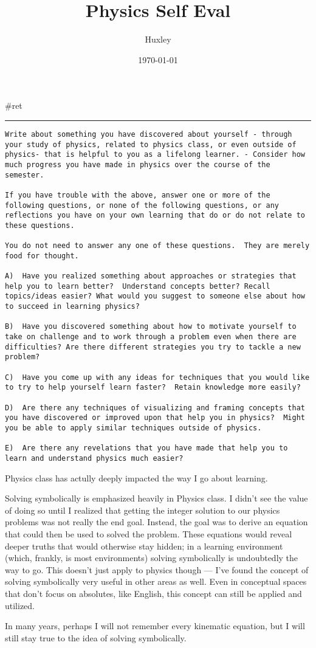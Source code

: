 \documentclass[letterpaper]{article}
\author{Huxley}
\date{\today}
\title{Physics Self Eval}
\renewcommand{\tableofcontents}{}
\begin{document}
\tableofcontents

\#ret

\noindent\rule{\textwidth}{0.5pt}

\begin{verbatim}
Write about something you have discovered about yourself - through your study of physics, related to physics class, or even outside of physics- that is helpful to you as a lifelong learner. - Consider how much progress you have made in physics over the course of the semester.

If you have trouble with the above, answer one or more of the following questions, or none of the following questions, or any reflections you have on your own learning that do or do not relate to these questions.

You do not need to answer any one of these questions.  They are merely food for thought.

A)  Have you realized something about approaches or strategies that help you to learn better?  Understand concepts better? Recall topics/ideas easier? What would you suggest to someone else about how to succeed in learning physics?

B)  Have you discovered something about how to motivate yourself to take on challenge and to work through a problem even when there are difficulties? Are there different strategies you try to tackle a new problem?

C)  Have you come up with any ideas for techniques that you would like to try to help yourself learn faster?  Retain knowledge more easily?

D)  Are there any techniques of visualizing and framing concepts that you have discovered or improved upon that help you in physics?  Might you be able to apply similar techniques outside of physics.

E)  Are there any revelations that you have made that help you to learn and understand physics much easier?
\end{verbatim}

Physics class has actully deeply impacted the way I go about learning.

Solving symbolically is emphasized heavily in Physics class. I didn't
see the value of doing so until I realized that getting the integer
solution to our physics problems was not really the end goal. Instead,
the goal was to derive an equation that could then be used to solved the
problem. These equations would reveal deeper truths that would otherwise
stay hidden; in a learning environment (which, frankly, is most
environments) solving symbolically is undoubtedly the way to go. This
doesn't just apply to physics though --- I've found the concept of
solving symbolically very useful in other areas as well. Even in
conceptual spaces that don't focus on absolutes, like English, this
concept can still be applied and utilized.

In many years, perhaps I will not remember every kinematic equation, but
I will still stay true to the idea of solving symbolically.
\end{document}
